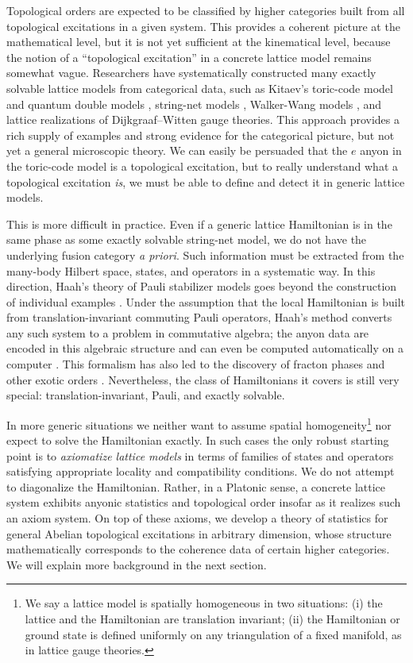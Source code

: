 \documentclass[reprint, amsmath, amssymb, showpacs, floatfix, longbibliography, aps, twocolumn, superscriptaddress, nofootinbib]{revtex4-2}
\theoremstyle{definition}
\begin{document}
Topological orders are expected to be classified by higher categories built from all topological excitations in a given system. This provides a coherent picture at the mathematical level, but it is not yet sufficient at the kinematical level, because the notion of a “topological excitation” in a concrete lattice model remains somewhat vague. Researchers have systematically constructed many exactly solvable lattice models from categorical data, such as Kitaev’s toric-code model and quantum double models \cite{Kitaev:1997wr},
string-net models \cite{Levin_2005,generalizedStringNet},  Walker-Wang models \cite{walker201131tqftstopologicalinsulators}, and lattice realizations of Dijkgraaf–Witten gauge theories. This approach provides a rich supply of examples and strong evidence for the categorical picture, but not yet a general microscopic theory.
We can easily be persuaded that the $e$ anyon in the toric-code model is a topological excitation, but to really understand what a topological excitation \textit{is}, we must be able to define and detect it in generic lattice models. 

This is more difficult in practice. Even if a generic lattice Hamiltonian is in the same phase as some exactly solvable string-net model, we do not have the underlying fusion category \textit{a priori}. Such information must be extracted from the many-body Hilbert space, states, and operators in a systematic way. In this direction, Haah’s theory of Pauli stabilizer models goes beyond the construction of individual examples \cite{HaahThesis}. Under the assumption that the local Hamiltonian is built from translation-invariant commuting Pauli operators, Haah’s method converts any such system to a problem in commutative algebra; the anyon data are encoded in this algebraic structure and can even be computed automatically on a computer \cite{Zijian1,Zijian2}. This formalism has also led to the discovery of fracton phases and other exotic orders \cite{Fractonphasesofmatter,Haah_2011}. Nevertheless, the class of Hamiltonians it covers is still very special: translation-invariant, Pauli, and exactly solvable.



In more generic situations we neither want to assume spatial homogeneity\footnote{We say a lattice model is spatially homogeneous in two situations: (i) the lattice and the Hamiltonian are translation invariant; (ii) the Hamiltonian or ground state is defined uniformly on any triangulation of a fixed manifold, as in lattice gauge theories.} nor expect to solve the Hamiltonian exactly. In such cases the only robust starting point is to \textit{axiomatize lattice models} in terms of families of states and operators satisfying appropriate locality and compatibility conditions. We do not attempt to diagonalize the Hamiltonian. Rather, in a Platonic sense, a concrete lattice system exhibits anyonic statistics and topological order insofar as it realizes such an axiom system. On top of these axioms, we develop a theory of statistics for general Abelian topological excitations in arbitrary dimension, whose structure mathematically corresponds to the coherence data of certain higher categories. We will explain more background in the next section.
\end{document}

